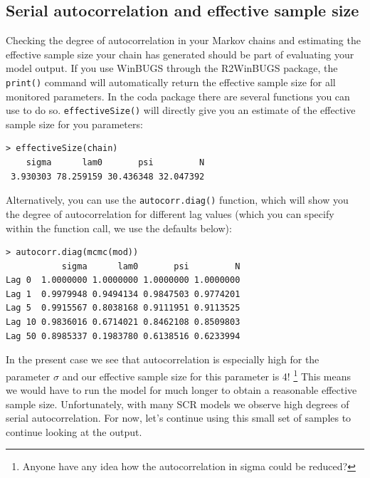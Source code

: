 \subsection{Serial autocorrelation and effective sample size}
Checking the degree of autocorrelation in your Markov chains and estimating the effective sample size your chain has generated should be part of evaluating your model output. If you use WinBUGS through the R2WinBUGS package, the \verb#print()# command will automatically return the effective sample size for all monitored parameters. In the coda package there are several functions you can use to do so. \verb#effectiveSize()# will directly give you an estimate of the effective sample size for you parameters:
\begin{verbatim}
> effectiveSize(chain)
    sigma      lam0       psi         N
 3.930303 78.259159 30.436348 32.047392
\end{verbatim}

Alternatively, you can use the \verb#autocorr.diag()# function, which will show you the degree of autocorrelation for different lag values (which you can specify within the function call, we use the defaults below):
\begin{verbatim}
> autocorr.diag(mcmc(mod))
           sigma      lam0       psi         N
Lag 0  1.0000000 1.0000000 1.0000000 1.0000000
Lag 1  0.9979948 0.9494134 0.9847503 0.9774201
Lag 5  0.9915567 0.8038168 0.9111951 0.9113525
Lag 10 0.9836016 0.6714021 0.8462108 0.8509803
Lag 50 0.8985337 0.1983780 0.6138516 0.6233994
\end{verbatim}
In the present case we see that autocorrelation is especially high for the parameter $\sigma$ and our effective sample size for this parameter is 4! \footnote{Anyone have any idea how the autocorrelation in sigma could be reduced?} This means we would have to run the model for much longer to obtain a reasonable effective sample size. Unfortunately, with many SCR models we observe high degrees of serial autocorrelation. For now, let's continue using this small set of samples to continue looking at the output.


